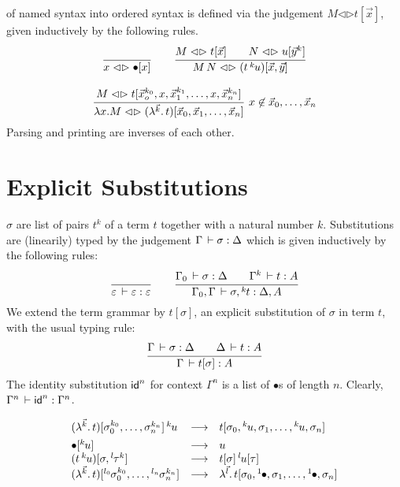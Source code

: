 \documentclass[a4paper]{article}
\newcommand{\oann}[1]{{}^{#1}\kern-0.15ex}
\newcommand{\ovar}{\mathord{\bullet}}
\newcommand{\oapp}[1]{\,\oann{#1}}
\newcommand{\olam}[1]{\lambda^{#1}.\,}
\newcommand{\lrhd}{\mathrel{\mathord{\lhd}\mathord{\rhd}}}
\newcommand{\osyn}[3]{#1 \lrhd \esubst{#2}{#3}}
\newcommand{\osynp}[3]{\osyn{#1}{(#2)}{#3}}
\renewcommand{\esubst}[2]{#1[#2]}
\newcommand{\esubstp}[2]{\esubst{(#1)}{#2}}
\renewcommand{\cempty}{\varepsilon}
\renewcommand{\sempty}{\varepsilon}
\begin{document}
 of named syntax into ordered syntax is defined via the
judgement $\osyn M t {\vec x}$, given inductively by the following rules.
\begin{gather*}
  \ru{}{\osyn x \ovar x}
\qquad
  \ru{\osyn M t {\vec x} \qquad 
      \osyn N u {\vec y^k}
    }{\osynp {M\,N} {t \oapp k u} {\vec x, \vec y}}
\\[2ex]
  \rux{\osyn M t {\vec x_o^{k_0},x,\vec x_1^{k_1},\dots,x,\vec x_n^{k_n}}
     }{\osynp {\lambda x.M} {\olam {\vec k} t}
         {\vec x_0,\vec x_1,\dots,\vec x_n}
    }{x \not\in \vec x_0,\dots,\vec x_n}
\end{gather*}
Parsing and printing are inverses of each other.


\section{Explicit Substitutions}

 $\sigma$ are list of pairs $t^k$ of a term $t$ together
with a natural number $k$.  Substitutions are (linearily) typed by the judgement
$\Gamma \,\vdash \sigma : \Delta$ which is given inductively by the
following rules:
\begin{gather*}
  \ru{
    }{\cempty \der \sempty : \cempty}
\qquad
  \ru{\Gamma_0 \der \sigma : \Delta \qquad
      \Gamma^k \der t : A
    }{\Gamma_0,\Gamma \der \sigma, \oann k t : \Delta,A}
\end{gather*}
We extend the term grammar by $\esubst t \sigma$, an explicit substitution of
$\sigma$ in term $t$, with the usual typing rule:
\begin{gather*}
  \ru{\Gamma \der \sigma : \Delta \qquad
      \Delta \der t : A
    }{\Gamma \der \esubst t \sigma : A}
\end{gather*}
The identity substitution $\mathsf{id}^n$ for context $\Gamma^n$ is a list of
$\ovar$s of length $n$.  Clearly, $\Gamma^n \,\vdash \mathsf{id}^n : \Gamma^n$.

\[
\begin{array}{lll}
  \esubstp {\olam {\vec k} t} {\sigma_0^{k_0},\dots,\sigma_n^{k_n}} \oapp k u
  & \red & \esubst t {\sigma_0,\oann k u,\sigma_1, \dots, \oann k u,\sigma_n}
\\[1ex]
  \esubst \ovar {\oann k u} 
  & \red & u 
\\
  \esubstp {t \oapp k u} {\sigma,\oann l {\tau^k}} 
  & \red & \esubst t \sigma \oapp l \esubst u \tau 
\\ 
  \esubstp {\olam {\vec k} t} {\oann{l_0}{\sigma_0^{k_0}},\dots,\oann{l_n}{\sigma_n^{k_n}}}
  & \red & \olam {\vec l} \esubst t {\sigma_0,\oann 1
    \ovar,\sigma_1,\dots,\oann 1 \ovar,\sigma_n}
\end{array}
\]
\end{document}
